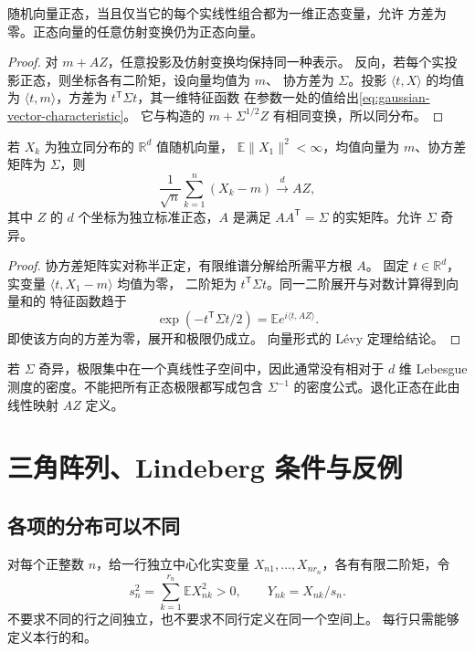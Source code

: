 \begin{proposition}
\label{prop:gaussian-vector-characteristic}
随机向量正态，当且仅当它的每个实线性组合都为一维正态变量，允许
方差为零。正态向量的任意仿射变换仍为正态向量。
\end{proposition}

\begin{proof}
对 $m+AZ$，任意投影及仿射变换均保持同一种表示。
反向，若每个实投影正态，则坐标各有二阶矩，设向量均值为 $m$、
协方差为 $\Sigma$。投影 $\langle t,X\rangle$ 的均值为
$\langle t,m\rangle$，方差为 $t^{\mathsf T}\Sigma t$，其一维特征函数
在参数一处的值给出\eqref{eq:gaussian-vector-characteristic}。
它与构造的 $m+\Sigma^{1/2}Z$ 有相同变换，所以同分布。
\end{proof}

\begin{theorem}[向量中心极限定理]
\label{thm:multivariate-central-limit}
若 $X_k$ 为独立同分布的 $\mathbb R^d$ 值随机向量，
$\mathbb E\|X_1\|^2<\infty$，均值向量为 $m$、协方差矩阵为 $\Sigma$，则
\[
 \frac1{\sqrt n}\sum_{k=1}^n(X_k-m)\xrightarrow d AZ,
\]
其中 $Z$ 的 $d$ 个坐标为独立标准正态，$A$ 是满足
$AA^{\mathsf T}=\Sigma$ 的实矩阵。允许 $\Sigma$ 奇异。
\end{theorem}

\begin{proof}
协方差矩阵实对称半正定，有限维谱分解给所需平方根 $A$。
固定 $t\in\mathbb R^d$，实变量 $\langle t,X_1-m\rangle$ 均值为零，
二阶矩为 $t^{\mathsf T}\Sigma t$。同一二阶展开与对数计算得到向量和的
特征函数趋于
\[
 \exp(-t^{\mathsf T}\Sigma t/2)
 =\mathbb E e^{i\langle t,AZ\rangle}.
\]
即使该方向的方差为零，展开和极限仍成立。
向量形式的 Lévy 定理给结论。
\end{proof}

若 $\Sigma$ 奇异，极限集中在一个真线性子空间中，因此通常没有相对于
$d$ 维 Lebesgue 测度的密度。不能把所有正态极限都写成包含
$\Sigma^{-1}$ 的密度公式。退化正态在此由线性映射 $AZ$ 定义。

\section{三角阵列、Lindeberg 条件与反例}
\label{sec:lindeberg-arrays}

\subsection{各项的分布可以不同}

对每个正整数 $n$，给一行独立中心化实变量
$X_{n1},\ldots,X_{nr_n}$，各有有限二阶矩，令
\[
 s_n^2=\sum_{k=1}^{r_n}\mathbb E X_{nk}^2>0,
 \qquad Y_{nk}=X_{nk}/s_n.
\]
不要求不同的行之间独立，也不要求不同行定义在同一个空间上。
每行只需能够定义本行的和。

